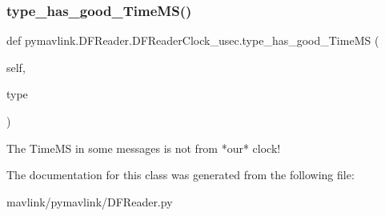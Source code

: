 \subsubsection{\texorpdfstring{type\+\_\+has\+\_\+good\+\_\+\+Time\+M\+S()}{type\_has\_good\_TimeMS()}}
{\footnotesize\ttfamily def pymavlink.\+D\+F\+Reader.\+D\+F\+Reader\+Clock\+\_\+usec.\+type\+\_\+has\+\_\+good\+\_\+\+Time\+MS (\begin{DoxyParamCaption}\item[{}]{self,  }\item[{}]{type }\end{DoxyParamCaption})}

\begin{DoxyVerb}The TimeMS in some messages is not from *our* clock!\end{DoxyVerb}
 

The documentation for this class was generated from the following file\+:\begin{DoxyCompactItemize}
\item 
mavlink/pymavlink/D\+F\+Reader.\+py\end{DoxyCompactItemize}
